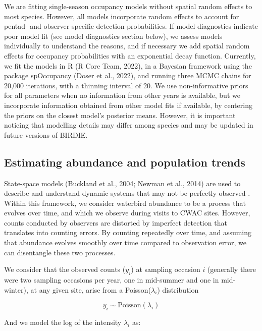 \documentclass[utf8]{frontiersSCNS}
\begin{document}
We are fitting single-season occupancy models without spatial random
effects to most species. However, all models incorporate random effects
to account for pentad- and observer-specific detection probabilities. If
model diagnostics indicate poor model fit (see model diagnostics section
below), we assess models individually to understand the reasons, and if
necessary we add spatial random effects for occupancy probabilities with
an exponential decay function. Currently, we fit the models in R (R Core
Team, 2022), in a Bayesian framework using the package spOccupancy
(Doser et al., 2022), and running three MCMC chains for 20,000
iterations, with a thinning interval of 20. We use non-informative
priors for all parameters when no information from other years is
available, but we incorporate information obtained from other model fits
if available, by centering the priors on the closest model's posterior
means. However, it is important noticing that modelling details may
differ among species and may be updated in future versions of BIRDIE.

\hypertarget{estimating-abundance-and-population-trends}{%
\subsection*{Estimating abundance and population
trends}\label{estimating-abundance-and-population-trends}}

State-space models (Buckland et al., 2004; Newman et al., 2014) are used
to describe and understand dynamic systems that may not be perfectly
observed . Within this framework, we consider waterbird abundance to be
a process that evolves over time, and which we observe during visits to
CWAC sites. However, counts conducted by observers are distorted by
imperfect detection that translates into counting errors. By counting
repeatedly over time, and assuming that abundance evolves smoothly over
time compared to observation error, we can disentangle these two
processes.

We consider that the observed counts (\(y_i\)) at sampling occasion
\(i\) (generally there were two sampling occasions per year, one in
mid-summer and one in mid-winter), at any given site, arise from a
Poisson(\(\lambda_i\)) distribution

\[y_i \sim \textrm{Poisson}(\lambda_i)\]

And we model the log of the intensity \(\lambda_i\) as:
\end{document}
